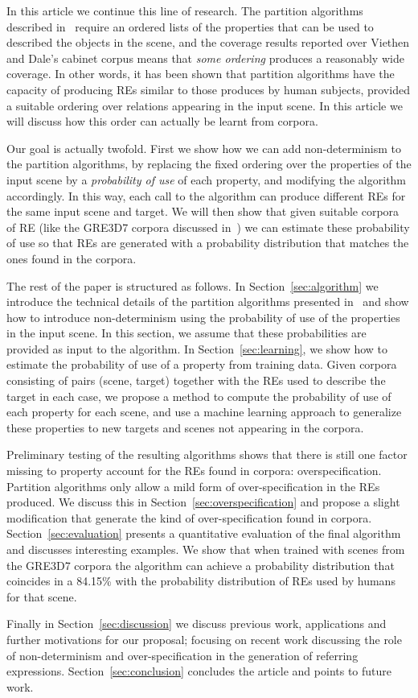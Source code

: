 In this article we continue this line of research.  The partition algorithms described in~\cite{arec:refe08,arec:usin11} require an 
ordered lists of the properties that can be used to described the objects in the scene, and the coverage results reported over Viethen and 
Dale's cabinet corpus means that \emph{some ordering} produces a reasonably wide coverage.  In other words, it has been shown that partition algorithms have the capacity of producing REs similar to those produces by human subjects, provided a suitable ordering over relations appearing 
in the input scene. In this article we will discuss how this order can actually be learnt from corpora.  

Our goal is actually twofold. First we show how we can add non-determinism to the partition algorithms, by replacing the fixed ordering 
over the properties of the input scene by a \emph{probability of use} of each property, and modifying the algorithm accordingly.  
In this way, each call to the algorithm can produce different REs for the same input scene and target.  We will then show that given suitable corpora of RE (like the GRE3D7 corpora discussed in~\cite{viet:gene11}) we can estimate these probability of use so that REs are generated with a probability distribution that matches the ones found in the corpora.  

The rest of the paper is structured as follows. In Section~\ref{sec:algorithm} we introduce the technical details of the 
partition algorithms presented in~\cite{arec:refe08,arec:usin11} and show how to introduce non-determinism using 
the probability of use of the properties in the input scene.  In this section, we assume that these probabilities are provided as 
input to the algorithm. In Section~\ref{sec:learning}, we show how to estimate the 
probability of use of a property from training data. Given corpora consisting of pairs (scene, target) together with the REs used to 
describe the target in each case, we propose a method to compute the probability of use of each property for each scene, and use a machine learning approach to generalize these properties to new targets and scenes not appearing in the corpora. 

Preliminary testing of the resulting algorithms shows that there is still one factor missing to property account for the REs found in corpora: overspecification.  Partition algorithms only allow a mild form of over-specification in the REs produced.  We discuss this in Section~\ref{sec:overspecification} and propose a slight modification that generate the kind of over-specification found in corpora. 
Section~\ref{sec:evaluation} presents a quantitative evaluation of the final algorithm and discusses interesting examples. We show that when trained with scenes from the GRE3D7 corpora the algorithm can achieve a probability distribution that coincides in a 84.15\% with the probability distribution of REs used by humans for that scene. 

Finally in Section~\ref{sec:discussion} we discuss previous work, applications and further motivations for our proposal; focusing on recent work discussing the role of non-determinism and over-specification in the generation of referring expressions. Section~\ref{sec:conclusion} concludes the article and points to future work.

